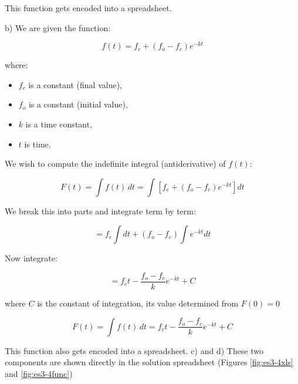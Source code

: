 \documentclass[12pt]{article}
\begin{document}
\begin{enumerate}
This function gets encoded into a spreadsheet.

b) We are given the function:

$$
f(t) = f_c + (f_o - f_c) e^{-k t}
$$

where:
\begin{itemize}
    \item \( f_c \) is a constant (final value),
    \item \( f_o \) is a constant (initial value),
    \item \( k \) is a time constant,
    \item \( t \) is time.
\end{itemize}

We wish to compute the indefinite integral (antiderivative) of \( f(t) \):

\[
F(t) = \int f(t)\, dt = \int \left[ f_c + (f_o - f_c) e^{-kt} \right] dt
\]

We break this into parts and integrate term by term:

\[
= f_c \int dt + (f_o - f_c) \int e^{-kt} dt
\]

Now integrate:

\[
= f_c t - \frac{f_o - f_c}{k} e^{-kt} + C
\]

where \( C \) is the constant of integration, its value determined from $F(0)=0$

\[
\boxed{ F(t) = \int f(t)\, dt = f_c t - \frac{f_o - f_c}{k} e^{-kt} + C }
\] 

This function also gets encoded into a spreadsheet.
\clearpage
c) and d) These two components are shown directly in the solution spreadsheet (Figures \ref{fig:es3-4xls} and \ref{fig:es3-4func})


\end{enumerate}
\end{document}
